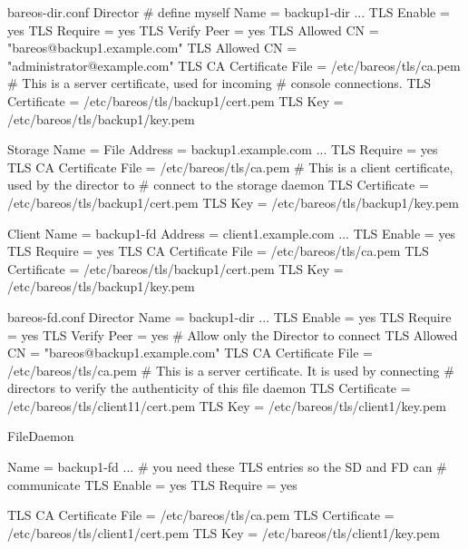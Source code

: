 \begin{bconfig}{bareos-dir.conf}
Director {                            # define myself
    Name = backup1-dir
    ...
    TLS Enable = yes
    TLS Require = yes
    TLS Verify Peer = yes
    TLS Allowed CN = "bareos@backup1.example.com"
    TLS Allowed CN = "administrator@example.com"
    TLS CA Certificate File = /etc/bareos/tls/ca.pem
    # This is a server certificate, used for incoming
    # console connections.
    TLS Certificate = /etc/bareos/tls/backup1/cert.pem
    TLS Key = /etc/bareos/tls/backup1/key.pem
}

Storage {
    Name = File
    Address = backup1.example.com
    ...
    TLS Require = yes
    TLS CA Certificate File = /etc/bareos/tls/ca.pem
    # This is a client certificate, used by the director to
    # connect to the storage daemon
    TLS Certificate = /etc/bareos/tls/backup1/cert.pem
    TLS Key = /etc/bareos/tls/backup1/key.pem
}

Client {
    Name = backup1-fd
    Address = client1.example.com
    ...
    TLS Enable = yes
    TLS Require = yes
    TLS CA Certificate File = /etc/bareos/tls/ca.pem
    TLS Certificate = /etc/bareos/tls/backup1/cert.pem
    TLS Key = /etc/bareos/tls/backup1/key.pem
}
\end{bconfig}

\begin{bconfig}{bareos-fd.conf}
Director {
    Name = backup1-dir
    ...
    TLS Enable = yes
    TLS Require = yes
    TLS Verify Peer = yes
    # Allow only the Director to connect
    TLS Allowed CN = "bareos@backup1.example.com"
    TLS CA Certificate File = /etc/bareos/tls/ca.pem
    # This is a server certificate. It is used by connecting
    # directors to verify the authenticity of this file daemon
    TLS Certificate = /etc/bareos/tls/client11/cert.pem
    TLS Key = /etc/bareos/tls/client1/key.pem
}

FileDaemon {
    Name = backup1-fd
    ...
    # you need these TLS entries so the SD and FD can
    # communicate
    TLS Enable = yes
    TLS Require = yes

    TLS CA Certificate File = /etc/bareos/tls/ca.pem
    TLS Certificate = /etc/bareos/tls/client1/cert.pem
    TLS Key = /etc/bareos/tls/client1/key.pem
}
\end{bconfig}

